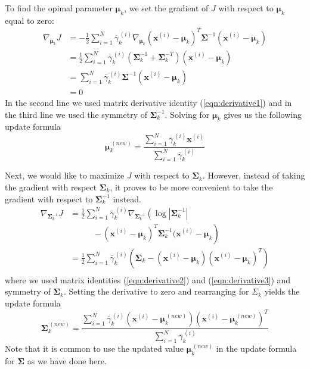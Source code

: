 \documentclass[final,3p,times,twocolumn]{elsarticle}
\let\bs\boldsymbol
\let\ol\overline
\begin{document}
To find the opimal parameter $\bs\mu_k$, we set the gradient of $J$ with respect to $\bs \mu_k$ equal to zero:
\begin{equation}
\begin{split}
\nabla_{\bs\mu_k} J &= -\frac{1}{2}\sum_{i=1}^N \ol\gamma_k^{\,(i)} \nabla_{\bs\mu_k} (\bs x^{(i)} - \bs\mu_k)^T \bs\Sigma^{-1}(\bs x^{(i)} - \bs\mu_k)\\
&= \frac{1}{2}\sum_{i=1}^N \ol\gamma_k^{\,(i)}(\bs\Sigma_k^{-1} + \bs\Sigma_k^{-T})(\bs x^{(i)} - \bs\mu_k)\\
&= \sum_{i=1}^N\ol\gamma_k^{\,(i)} \bs\Sigma^{-1} (\bs x^{(i)} - \bs\mu_k)\\
&= 0
\end{split}
\end{equation}
In the second line we used matrix derivative identity (\ref{eqn:derivative1}) and in the third line we used the symmetry of $\bs\Sigma^{-1}_k$.
Solving for $\bs\mu_k$ gives us the following update formula
\begin{equation}
\label{eqn:gmmMu}
\bs\mu_k^{\,(new)} = \frac{\sum_{i=1}^N\ol\gamma_k^{\,(i)} \bs x^{(i)}}{\sum_{i=1}^N \ol\gamma_k^{\,(i)}}
\end{equation}

Next, we would like to maximize $J$ with respect to $\bs\Sigma_k$.
However, instead of taking the gradient with respect $\bs\Sigma_k$, it proves to be more convenient to take the gradient with respect to $\bs\Sigma_k^{-1}$ instead.
\begin{equation}
\begin{split}
\nabla_{\bs \Sigma_k^{-1}}J &= \frac{1}{2}\sum_{i=1}^N \ol\gamma_k^{\,(i)}\nabla_{\bs\Sigma_k^{-1}}\left(\log \left|\bs \Sigma_k^{-1}\right| \right.\\
&\qquad\quad\left. -\,(\bs x^{(i)} - \bs \mu_k)^T \bs\Sigma_k^{-1}(\bs x^{(i)} - \bs\mu_k\right)\\
&=\frac{1}{2}\sum_{i=1}^N \ol\gamma_k^{\,(i)}\left(\bs \Sigma_k - (\bs x^{(i)} - \bs \mu_k)(\bs x^{(i)} - \bs \mu_k)^T\right)\\
\end{split}
\end{equation}
where we used matrix identities (\ref{eqn:derivative2}) and (\ref{eqn:derivative3}) and symmetry of $\bs\Sigma_k$.
Setting the derivative to zero and rearranging for $\Sigma_k$ yields the update formula
\begin{equation}
\label{eqn:gmmSigma}
\bs \Sigma_k^{\,(new)} = \frac{\sum_{i=1}^N \ol\gamma_k^{\,(i)}(\bs x^{(i)}-\bs\mu_k^{\,(new)})(\bs x^{(i)}-\bs\mu_k^{\,(new)})^T}{\sum_{i=1}^N \ol\gamma_k^{\,(i)}}
\end{equation}
Note that it is common to use the updated value $\bs\mu_k^{\,(new)}$ in the update formula for $\bs\Sigma$ as we have done here.
\end{document}
